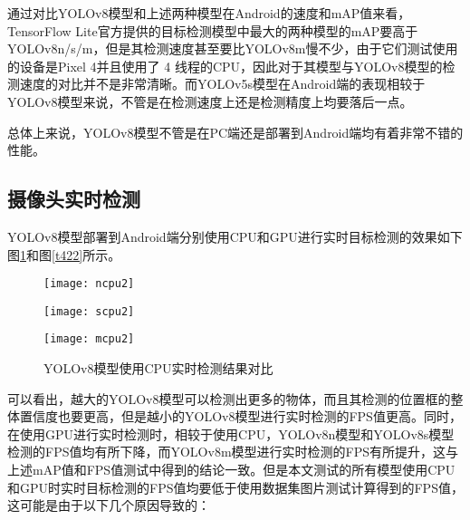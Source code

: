 \documentclass{ctexart}
\numberwithin{equation}{section}%
\numberwithin{figure}{section}%
\numberwithin{table}{section}%
\begin{document}
	通过对比YOLOv8模型和上述两种模型在Android的速度和mAP值来看，TensorFlow Lite官方提供的目标检测模型中最大的两种模型的mAP要高于YOLOv8n/s/m，但是其检测速度甚至要比YOLOv8m慢不少，由于它们测试使用的设备是Pixel 4并且使用了 4 线程的CPU，因此对于其模型与YOLOv8模型的检测速度的对比并不是非常清晰。而YOLOv5s模型在Android端的表现相较于YOLOv8模型来说，不管是在检测速度上还是检测精度上均要落后一点。
	
	总体上来说，YOLOv8模型不管是在PC端还是部署到Android端均有着非常不错的性能。
	
	\subsection{摄像头实时检测}
	YOLOv8模型部署到Android端分别使用CPU和GPU进行实时目标检测的效果如下图\ref{t421}和图\ref{t422}所示。
	
	\begin{figure}[h]
	\centering
			\begin{minipage}{0.28\linewidth}
				\centering
				\texttt{[image: ncpu2]}
			\end{minipage}
			\begin{minipage}{0.28\linewidth}
				\centering
				\texttt{[image: scpu2]}
			\end{minipage}
			\begin{minipage}{0.28\linewidth}
				\centering
				\texttt{[image: mcpu2]}
			\end{minipage}
			\caption{YOLOv8模型使用CPU实时检测结果对比}
			\label{t421}%
\end{figure}

	可以看出，越大的YOLOv8模型可以检测出更多的物体，而且其检测的位置框的整体置信度也要更高，但是越小的YOLOv8模型进行实时检测的FPS值更高。同时，在使用GPU进行实时检测时，相较于使用CPU，YOLOv8n模型和YOLOv8s模型检测的FPS值均有所下降，而YOLOv8m模型进行实时检测的FPS有所提升，这与上述mAP值和FPS值测试中得到的结论一致。但是本文测试的所有模型使用CPU和GPU时实时目标检测的FPS值均要低于使用数据集图片测试计算得到的FPS值，这可能是由于以下几个原因导致的：
	
\end{document}
